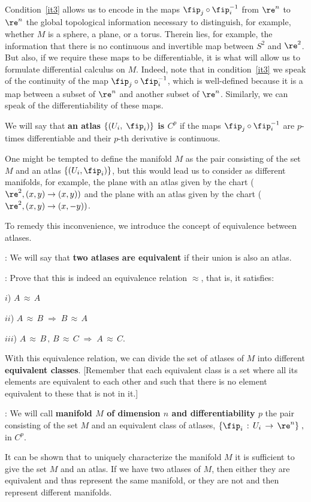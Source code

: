 Condition~\ref{it3} allows us to encode in the maps $\fip_j\circ\fip_i^{-1}$ from $\re^n$ to $\re^n$ the global topological information necessary to distinguish, for example, whether $M$ is a sphere, a plane, or a torus. 
Therein lies, for example, the information that there is no continuous and invertible map between $S^2$ and $\re^2$.
But also, if we require these maps to be differentiable, it is what will allow us to formulate differential calculus on $M$.
Indeed, note that in condition~\ref{it3} we speak of the continuity of the map $\fip_j\circ \fip_i^{-1}$, which is well-defined because it is a map between a subset of $\re^n$ and another subset of $\re^n$. Similarly, we can speak of the differentiability of these maps.

We will say that {\bf an atlas $\{(U_i,\;\fip_i)\}$ is $C^p$} if the maps $\fip_j\circ\fip_i^{-1}$ are $p$-times differentiable and their $p$-th derivative is continuous.

One might be tempted to define the manifold $M$ as the pair consisting of the set $M$ and an atlas $\{(U_i,\fip_i)\}$, but this would lead us to consider as different manifolds, for example, the plane with an atlas given by the chart ($\re^2,(x,y)\to (x,y))$ and the plane with an atlas given by the chart ($\re^2,(x,y)\to (x,-y))$.

To remedy this inconvenience, we introduce the concept of equivalence between atlases.

: We will say that {\bf two atlases are equivalent} if their union is also an atlas.

\ejer: Prove that this is indeed an equivalence relation $\approx$, that is, it satisfies:

$i$) $A\,\approx\,A$

$ii$) $A\,\approx \,B\;\Longrightarrow\;B\,\approx\,A$

$iii$) $A\,\approx\,B\, , \, B\,\approx\,C\;\Longrightarrow\;A\,\approx\,C$.

With this equivalence relation, we can divide the set of atlases of $M$ into different {\bf equivalent classes}. [Remember that each equivalent class is a set where all its elements are equivalent to each other and such that there is no element equivalent to these that is not in it.]

: We will call {\bf manifold $M$ of dimension $n$ and differentiability $p$} the pair consisting of the set $M$ and an equivalent class of atlases, $\{\fip_i\,:\,U_i\,\to\,\re^n\}\;,$ in $C^p$.

It can be shown that to uniquely characterize the manifold $M$ it is sufficient to give the set $M$ and an atlas. If we have two atlases of $M$, then either they are equivalent and thus represent the same manifold, or they are not and then represent different manifolds.

